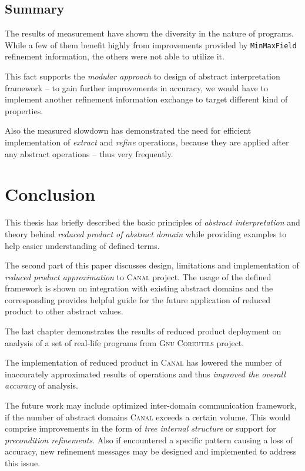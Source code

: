 \documentclass[12pt,oneside]{fithesis2}
\theoremstyle{definition}
\begin{document}
\section{Summary}

The results of measurement have shown the diversity in the nature of programs. While a few of them benefit highly from improvements provided by \texttt{MinMaxField} refinement information, the others were not able to utilize it.

This fact supports the \textit{modular approach} to design of abstract interpretation framework -- to gain further improvements in accuracy, we would have to implement another refinement information exchange to target different kind of properties.

Also the measured slowdown has demonstrated the need for efficient implementation of \textit{extract} and \textit{refine} operations, because they are applied after any abstract operations -- thus very frequently.

\chapter{Conclusion}

This thesis has briefly described the basic principles of \textit{abstract interpretation} and theory behind \textit{reduced product of abstract domain} while providing examples to help easier understanding of defined terms.

The second part of this paper discusses design, limitations and implementation of \textit{reduced product approximation} to \textsc{Canal} project. The usage of the defined framework is shown on integration with existing abstract domains and the corresponding provides helpful guide for the future application of reduced product to other abstract values.

The last chapter demonstrates the results of reduced product deployment on analysis of a set of real-life programs from \textsc{Gnu Coreutils} project.

The implementation of reduced product in \textsc{Canal} has lowered the number of inaccurately approximated results of operations and thus \textit{improved the overall accuracy} of analysis.

The future work may include optimized inter-domain communication framework, if the number of abstract domains \textsc{Canal} exceeds a certain volume. This would comprise improvements in the form of \textit{tree internal structure} or support for \textit{precondition refinements}. Also if encountered a specific pattern causing a loss of accuracy, new refinement messages may be designed and implemented to address this issue.
\end{document}
